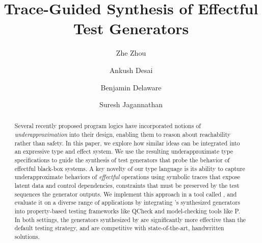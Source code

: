 \documentclass[acmsmall]{acmart}
\begin{document}
\title{Trace-Guided Synthesis of Effectful Test Generators}

\author{Zhe Zhou}

\author{Ankush Desai}

\author{Benjamin Delaware}

\author{Suresh Jagannathan}









\begin{abstract}
  Several recently proposed program logics have incorporated notions
  of \emph{underapproximation} into their design, enabling them to
  reason about reachability rather than safety. In this paper, we
  explore how similar ideas can be integrated into an expressive type
  and effect system.  We use the resulting underapproximate type
  specifications to guide the synthesis of test generators that probe
  the behavior of effectful black-box systems. A key novelty of our
  type language is its ability to capture underapproximate behaviors
  of \emph{effectful} operations using symbolic traces that expose
  latent data and control dependencies, constraints that must be
  preserved by the test sequences the generator outputs.  We
  implement this approach in a tool called \name{}, and evaluate it on
  a diverse range of applications by integrating \name{}'s synthesized
  generators into property-based testing frameworks like QCheck and
  model-checking tools like P.  In both settings, the generators
  synthesized by \name{} are significantly more effective than the
  default testing strategy, and are competitive with state-of-the-art,
  handwritten solutions.
\end{abstract}
\end{document}
